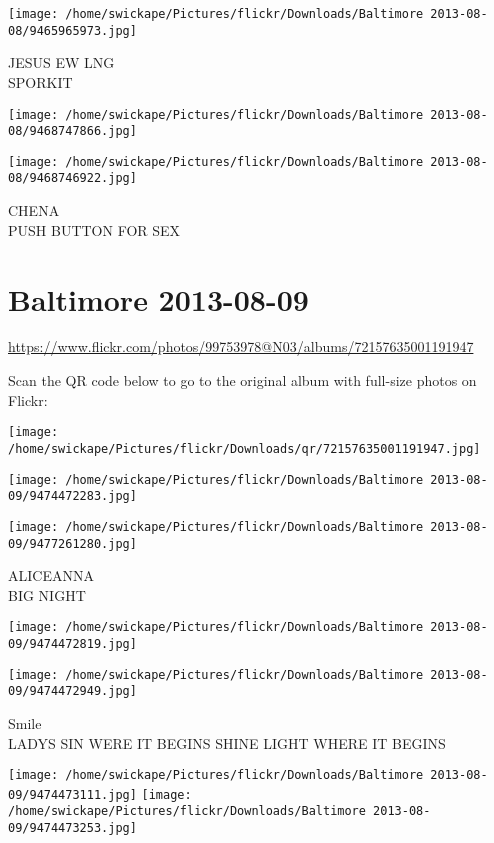 \documentclass[10pt,letterpaper]{article}
\begin{document}
\vspace{0.25in}
\texttt{[image: /home/swickape/Pictures/flickr/Downloads/Baltimore 2013-08-08/9465965973.jpg]}

JESUS EW LNG\\
SPORKIT
\pagebreak

\texttt{[image: /home/swickape/Pictures/flickr/Downloads/Baltimore 2013-08-08/9468747866.jpg]}

\vspace{0.25in}
\texttt{[image: /home/swickape/Pictures/flickr/Downloads/Baltimore 2013-08-08/9468746922.jpg]}

CHENA\\
PUSH BUTTON FOR SEX
\pagebreak

\section*{Baltimore 2013-08-09}

\url{https://www.flickr.com/photos/99753978@N03/albums/72157635001191947}

Scan the QR code below to go to the original album with full-size photos on Flickr:

\texttt{[image: /home/swickape/Pictures/flickr/Downloads/qr/72157635001191947.jpg]}
\pagebreak

\texttt{[image: /home/swickape/Pictures/flickr/Downloads/Baltimore 2013-08-09/9474472283.jpg]}

\vspace{0.25in}
\texttt{[image: /home/swickape/Pictures/flickr/Downloads/Baltimore 2013-08-09/9477261280.jpg]}

ALICEANNA\\
BIG NIGHT
\pagebreak

\texttt{[image: /home/swickape/Pictures/flickr/Downloads/Baltimore 2013-08-09/9474472819.jpg]}

\vspace{0.25in}
\texttt{[image: /home/swickape/Pictures/flickr/Downloads/Baltimore 2013-08-09/9474472949.jpg]}

Smile\\
LADYS SIN WERE IT BEGINS SHINE LIGHT WHERE IT BEGINS
\pagebreak

\texttt{[image: /home/swickape/Pictures/flickr/Downloads/Baltimore 2013-08-09/9474473111.jpg]}
\texttt{[image: /home/swickape/Pictures/flickr/Downloads/Baltimore 2013-08-09/9474473253.jpg]}
\end{document}
